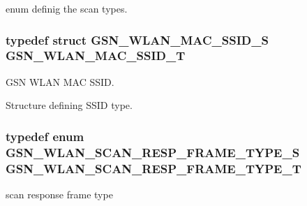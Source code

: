 enum definig the scan types. 

\hypertarget{a00641_gab5c477ba63fc3009f84b8dfc5efb6b81}{
\subsubsection[{GSN\_\-WLAN\_\-MAC\_\-SSID\_\-T}]{\setlength{\rightskip}{0pt plus 5cm}typedef struct {\bf GSN\_\-WLAN\_\-MAC\_\-SSID\_\-S}  {\bf GSN\_\-WLAN\_\-MAC\_\-SSID\_\-T}}}
\label{a00641_gab5c477ba63fc3009f84b8dfc5efb6b81}


GSN WLAN MAC SSID. 

Structure defining SSID type. \hypertarget{a00641_gaa94bed1d5a9ada3dfd819b8719bf6d55}{
\subsubsection[{GSN\_\-WLAN\_\-SCAN\_\-RESP\_\-FRAME\_\-TYPE\_\-T}]{\setlength{\rightskip}{0pt plus 5cm}typedef enum {\bf GSN\_\-WLAN\_\-SCAN\_\-RESP\_\-FRAME\_\-TYPE\_\-S} {\bf GSN\_\-WLAN\_\-SCAN\_\-RESP\_\-FRAME\_\-TYPE\_\-T}}}
\label{a00641_gaa94bed1d5a9ada3dfd819b8719bf6d55}


scan response frame type 



